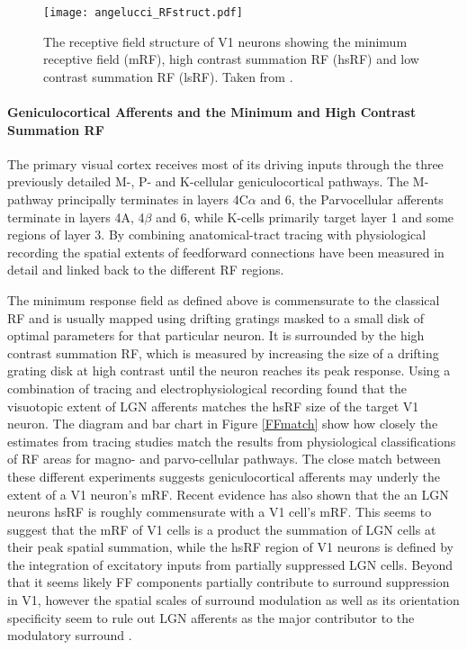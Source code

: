 \begin{figure}
	\centering
        \texttt{[image: angelucci\_RFstruct.pdf]}
	\caption{The receptive field structure of V1 neurons
        showing the minimum receptive field (mRF), high contrast
        summation RF (hsRF) and low contrast summation RF
        (lsRF). Taken from \cite{Angelucci2006}.}
	\label{RFstruct}
\end{figure}

\paragraph{Geniculocortical Afferents and the Minimum and High Contrast Summation RF}

The primary visual cortex receives most of its driving inputs through
the three previously detailed M-, P- and K-cellular geniculocortical
pathways. The M-pathway principally terminates in layers 4C$\alpha$
and 6, the Parvocellular afferents terminate in layers 4A, 4$\beta$
and 6, while K-cells primarily target layer 1 and some regions of
layer 3. By combining anatomical-tract tracing with physiological
recording the spatial extents of feedforward connections have been
measured in detail and linked back to the different RF regions.

The minimum response field as defined above is commensurate to the
classical RF and is usually mapped using drifting gratings masked to a
small disk of optimal parameters for that particular neuron. It is
surrounded by the high contrast summation RF, which is measured by
increasing the size of a drifting grating disk at high contrast until
the neuron reaches its peak response. Using a combination of tracing
and electrophysiological recording \citep{Angelucci2006a} found that
the visuotopic extent of LGN afferents matches the hsRF size of the
target V1 neuron. The diagram and bar chart in Figure \ref{FFmatch}
show how closely the estimates from tracing studies match the results
from physiological classifications of RF areas for magno- and
parvo-cellular pathways. The close match between these different
experiments suggests geniculocortical afferents may underly the extent
of a V1 neuron's mRF. Recent evidence has also shown that the an LGN
neurons hsRF is roughly commensurate with a V1 cell's mRF. This seems
to suggest that the mRF of V1 cells is a product the summation of LGN
cells at their peak spatial summation, while the hsRF region of V1
neurons is defined by the integration of excitatory inputs from
partially suppressed LGN cells. Beyond that it seems likely FF
components partially contribute to surround suppression in V1, however
the spatial scales of surround modulation as well as its orientation
specificity seem to rule out LGN afferents as the major contributor to
the modulatory surround \citep{Angelucci2002,Angelucci2006a}.

